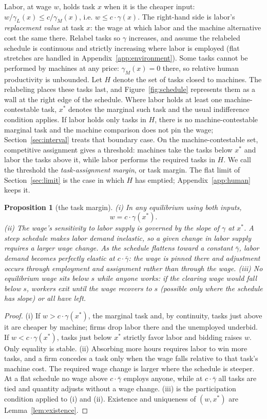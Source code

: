 \documentclass[12pt]{article}
\theoremstyle{plain}
\newtheorem{proposition}{Proposition}
\begin{document}
Labor, at wage $w$, holds task $x$ when it is the cheaper input:
$w/\gamma_L(x) \le c/\gamma_M(x)$, i.e.
$w \le c\cdot\gamma(x)$. The right-hand side is labor's \emph{replacement value} at task $x$: the wage at which labor and the machine alternative cost the same there. Relabel tasks so $\gamma$ increases, and assume the
relabeled schedule is continuous and strictly increasing where labor is employed
(flat stretches are handled in Appendix~\ref{app:environment}). Some tasks cannot be performed by machines at any price:
$\gamma_M(x)=0$ there, so relative human productivity is unbounded.
Let $H$ denote the set of tasks closed to machines. The relabeling places
these tasks last, and Figure~\ref{fig:schedule} represents them as a wall at
the right edge of the schedule. Where labor holds at least one
machine-contestable task, $x^*$ denotes the marginal such task and the usual
indifference condition applies. If labor holds only tasks in $H$, there is no
machine-contestable marginal task and the machine comparison does not pin the
wage; Section~\ref{sec:interval} treats that boundary case. On the
machine-contestable set, competitive assignment gives a threshold: machines
take the tasks below $x^*$ and labor the tasks above it, while labor performs
the required tasks in $H$. We call the threshold the \emph{task-assignment margin}, or task margin. The flat limit of Section~\ref{sec:limit} is the
case in which $H$ has emptied; Appendix~\ref{app:human} keeps it.

\begin{proposition}[the task margin]\label{prop:margin}
(i) In any equilibrium using both inputs,
\[
w = c\cdot\gamma(x^*).
\]
(ii) The wage's sensitivity to labor supply is governed by the slope of $\gamma$
at $x^*$. A steep schedule makes labor demand inelastic, so a given change in
labor supply requires a larger wage change. As the schedule flattens toward a
constant $\bar{\gamma}$, labor demand becomes perfectly elastic at
$c\cdot\bar{\gamma}$: the wage is pinned there and adjustment occurs through
employment and assignment rather than through the wage.
(iii) No equilibrium wage sits below $s$ while anyone works: if the clearing wage
would fall below $s$, workers exit until the wage recovers to $s$ (possible only
where the schedule has slope) or all have left.
\end{proposition}

\begin{proof}
(i) If $w > c\cdot\gamma(x^*)$, the marginal task and, by continuity, tasks just
above it are cheaper by machine; firms drop labor there and the unemployed
underbid. If $w < c\cdot\gamma(x^*)$, tasks just below $x^*$ strictly favor labor
and bidding raises $w$. Only equality is stable.
(ii) Absorbing more hours requires labor to win more tasks, and a firm concedes a
task only when the wage falls relative to that task's machine cost. The required
wage change is larger where the schedule is steeper. At a flat schedule no wage
above $c\cdot\bar{\gamma}$ employs anyone, while at
$c\cdot\bar{\gamma}$ all tasks are tied and quantity adjusts without a wage
change.
(iii) is the participation condition applied to (i) and (ii). Existence and
uniqueness of $(w,x^*)$ are Lemma~\ref{lem:existence}.
\end{proof}
\end{document}
